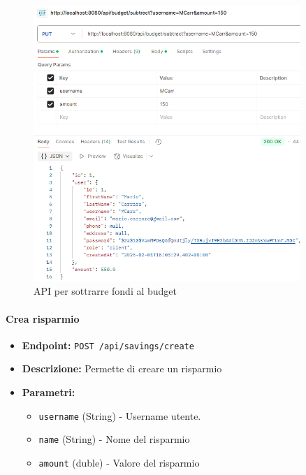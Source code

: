 \begin{figure}[H]
    \centering
    \includegraphics[width=0.9\textwidth]{images/SubtractBudgetAPI.png}
    \caption{API per sottrarre fondi al budget}
    \label{fig:SubtractBudgetAPI}
\end{figure}

\paragraph{Crea risparmio} 

\begin{itemize}
    \item \textbf{Endpoint:} \texttt{POST /api/savings/create}
    \item \textbf{Descrizione:} Permette di creare un risparmio
    \item \textbf{Parametri:}
    \begin{itemize}
        \item \texttt{username} (String) - Username utente.
        \item \texttt{name} (String) - Nome del risparmio
        \item \texttt{amount} (duble) - Valore del risparmio
    \end{itemize}
\end{itemize}

